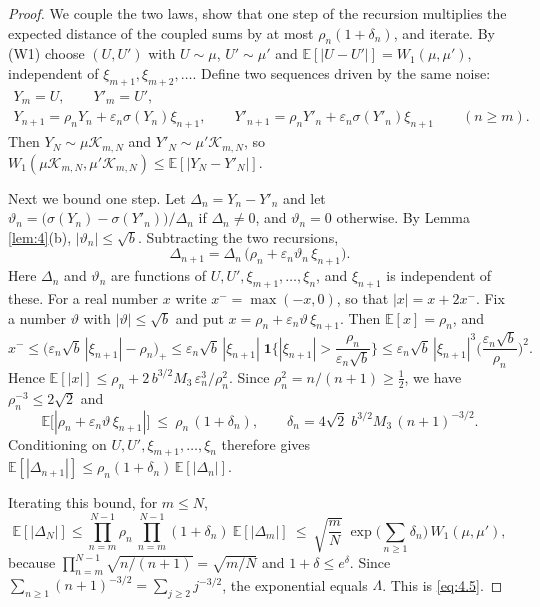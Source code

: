 \documentclass[aip,jmp,preprint,onecolumn,floatfix,superscriptaddress,nofootinbib,11pt]{revtex4-2}
\theoremstyle{plain}
\theoremstyle{remark}
\numberwithin{equation}{section}
\newcommand{\E}{\mathbb{E}}
\newcommand{\eps}{\varepsilon}
\begin{document}
\begin{proof} We couple the two laws, show that one step of the recursion multiplies the expected distance of the coupled sums by at most $\rho_n(1+\delta_n)$, and iterate. By (W1) choose $(U,U')$ with $U\sim\mu$, $U'\sim\mu'$ and $\E[|U-U'|]=W_1(\mu,\mu')$, independent of $\xi_{m+1},\xi_{m+2},\dots$. Define two sequences driven by the same noise:
%
\begin{equation*}
\begin{gathered} Y_m=U,\qquad Y'_m=U',\\[2pt] Y_{n+1}=\rho_nY_n+\eps_n\sigma(Y_n)\xi_{n+1},\qquad Y'_{n+1}=\rho_nY'_n+\eps_n\sigma(Y'_n)\xi_{n+1}\qquad(n\ge m). \end{gathered}
\end{equation*}
%
Then $Y_N\sim\mu \mathcal K_{m,N}$ and $Y'_N\sim\mu' \mathcal K_{m,N}$, so $W_1(\mu \mathcal K_{m,N},\mu' \mathcal K_{m,N})\le\E[|Y_N-Y'_N|]$.
 
Next we bound one step. Let $\Delta_n=Y_n-Y'_n$ and let $\vartheta_n=\big(\sigma(Y_n)-\sigma(Y'_n)\big)/\Delta_n$ if $\Delta_n\ne0$, and $\vartheta_n=0$ otherwise. By Lemma \ref{lem:4}(b), $|\vartheta_n|\le\sqrt b$. Subtracting the two recursions,
%
\begin{equation*}
\Delta_{n+1}=\Delta_n\,\big(\rho_n+\eps_n\vartheta_n\,\xi_{n+1}\big).
\end{equation*}
%
Here $\Delta_n$ and $\vartheta_n$ are functions of $U,U',\xi_{m+1},\dots,\xi_n$, and $\xi_{n+1}$ is independent of these. For a real number $x$ write $x^-=\max(-x,0)$, so that $|x|=x+2x^-$. Fix a number $\vartheta$ with $|\vartheta|\le\sqrt b$ and put $x=\rho_n+\eps_n\vartheta\,\xi_{n+1}$. Then $\E[x]=\rho_n$, and
%
\begin{equation*}
x^-\le\big(\eps_n\sqrt b\,|\xi_{n+1}|-\rho_n\big)_+\le\eps_n\sqrt b\,|\xi_{n+1}|\;\mathbf 1\Big\{|\xi_{n+1}|>\frac{\rho_n}{\eps_n\sqrt b}\Big\}\le\eps_n\sqrt b\,|\xi_{n+1}|^{3}\Big(\frac{\eps_n\sqrt b}{\rho_n}\Big)^{2}.
\end{equation*}
%
Hence $\E[|x|]\le\rho_n+2\,b^{3/2}M_3\,\eps_n^{3}/\rho_n^{2}$. Since $\rho_n^{2}=n/(n+1)\ge\tfrac12$, we have $\rho_n^{-3}\le2\sqrt2$ and
%
\begin{equation*}
\E\big[|\rho_n+\eps_n\vartheta\,\xi_{n+1}|\big]\ \le\ \rho_n\,(1+\delta_n),\qquad \delta_n=4\sqrt2\;b^{3/2}M_3\,(n+1)^{-3/2}.
\end{equation*}
%
Conditioning on $U,U',\xi_{m+1},\dots,\xi_n$ therefore gives $\E[|\Delta_{n+1}|]\le\rho_n(1+\delta_n)\,\E[|\Delta_n|]$. 
 
Iterating this bound, for $m\le N$,
%
\begin{equation*}
\E[|\Delta_N|]\le\prod_{n=m}^{N-1}\rho_n\ \prod_{n=m}^{N-1}(1+\delta_n)\ \E[|\Delta_m|]\ \le\ \sqrt{\frac mN}\;\exp\Big(\sum_{n\ge1}\delta_n\Big)\,W_1(\mu,\mu'),
\end{equation*}
%
because $\prod_{n=m}^{N-1}\sqrt{n/(n+1)}=\sqrt{m/N}$ and $1+\delta\le e^{\delta}$. Since $\sum_{n\ge1}(n+1)^{-3/2}=\sum_{j\ge2}j^{-3/2}$, the exponential equals $\Lambda$. This is \eqref{eq:4.5}.
\end{proof}
 
\end{document}
